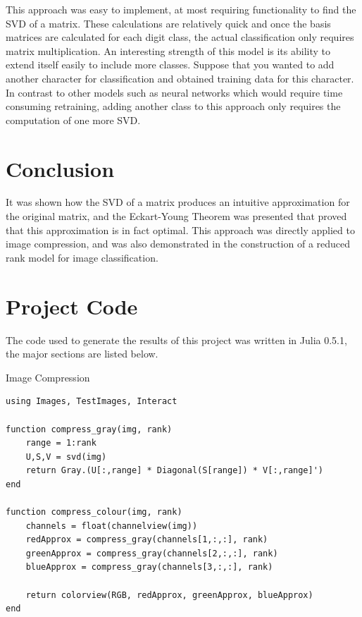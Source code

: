 \documentclass[a4paper]{article}
\begin{document}
This approach was easy to implement, at most requiring functionality to find the SVD of a matrix.  These calculations are relatively quick and once the basis matrices are calculated for each digit class, the actual classification only requires matrix multiplication.  An interesting strength of this model is its ability to extend itself easily to include more classes.  Suppose that you wanted to add another character for classification and obtained training data for this character.  In contrast to other models such as neural networks which would require time consuming retraining, adding another class to this approach only requires the computation of one more SVD.


\section{Conclusion}

It was shown how the SVD of a matrix produces an intuitive approximation for the original matrix, and the Eckart-Young Theorem was presented that proved that this approximation is in fact optimal.  This approach was directly applied to image compression, and was also demonstrated in the construction of a reduced rank model for image classification.

\section{Project Code}

The code used to generate the results of this project was written in Julia 0.5.1, the major sections are listed below.

\begin{algorithm}
\caption{Image Compression}

\begin{lstlisting}
using Images, TestImages, Interact

function compress_gray(img, rank)
    range = 1:rank
    U,S,V = svd(img)
    return Gray.(U[:,range] * Diagonal(S[range]) * V[:,range]')
end

function compress_colour(img, rank)
    channels = float(channelview(img))
    redApprox = compress_gray(channels[1,:,:], rank)
    greenApprox = compress_gray(channels[2,:,:], rank)
    blueApprox = compress_gray(channels[3,:,:], rank)
    
    return colorview(RGB, redApprox, greenApprox, blueApprox)
end
\end{lstlisting}

\end{algorithm}
\end{document}
